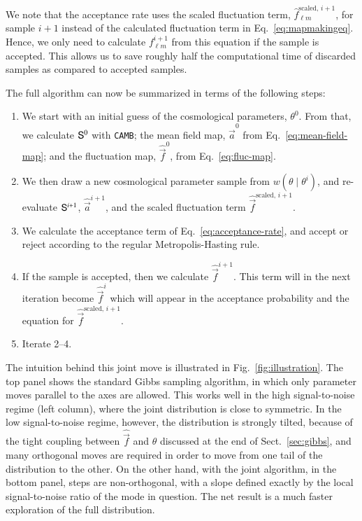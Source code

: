 \documentclass[twocolumn]{../common/aa}
\def\camb{\texttt{CAMB}}
\renewcommand{\a}[0]{\vec{a}}
\newcommand{\f}[0]{\vec{f}}
\renewcommand{\S}[0]{\tens{S}}
\begin{document}
We note that the acceptance rate uses the scaled fluctuation term, $\hat{f}_{\ell m}^{\textrm{scaled},\, i+1}$, for sample $i+1$ instead of the calculated fluctuation term in Eq.~\eqref{eq:mapmakingeq}. Hence, we only need to calculate $f_{\ell m}^{i+1}$ from this equation if the sample is accepted. This allows us to save roughly half the computational time of discarded samples as compared to accepted samples.

The full algorithm can now be summarized in terms of the following steps:
\begin{enumerate}
    \item We start with an initial guess of the cosmological parameters, $\theta^0$. From that, we calculate $\S^0$ with \camb; the mean field map, $\hat{\a}^0$ from Eq.~\eqref{eq:mean-field-map}; and the fluctuation map, $\hat{\f}^0$, from Eq.~\eqref{eq:fluc-map}.
    \item We then draw a new cosmological parameter sample from $w(\theta\mid\theta^i)$, and re-evaluate $\S^{i+1}$, $\hat{\a}^{i+1}$, and the scaled fluctuation term $\hat{\f}^{\textrm{scaled},\, i+1}$.
    \item We calculate the acceptance term of Eq.~\eqref{eq:acceptance-rate}, and accept or reject according to the regular Metropolis-Hasting rule.
    \item If the sample is accepted, then we calculate $\hat{\f}^{i+1}$. This term will in the next iteration become $\hat{\f}^{i}$ which will appear in the acceptance probability and the equation for $\hat{\f}^{\textrm{scaled},\, i+1}$. 
    \item Iterate 2--4.
\end{enumerate}

The intuition behind this joint move is illustrated in Fig.~\ref{fig:illustration}. The top panel shows the standard Gibbs sampling algorithm, in which only parameter moves parallel to the axes are allowed. This works well in the high signal-to-noise regime (left column), where the joint distribution is close to symmetric. In the low signal-to-noise regime, however, the distribution is strongly tilted, because of the tight coupling between $\hat{\f}$ and $\theta$ discussed at the end of Sect.~\ref{sec:gibbs}, and many orthogonal moves are required in order to move from one tail of the distribution to the other. On the other hand, with the joint algorithm, in the bottom panel, steps are non-orthogonal, with a slope defined exactly by the local signal-to-noise ratio of the mode in question. The net result is a much faster exploration of the full distribution.
\end{document}
